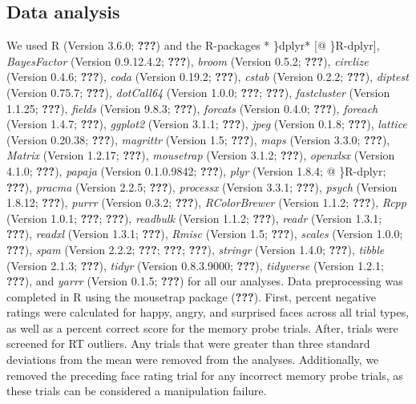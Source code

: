 \documentclass[man]{apa6}
\begin{document}
\hypertarget{data-analysis}{%
\subsection{Data analysis}\label{data-analysis}}

We used R (Version 3.6.0; {\textbf{???}}) and the R-packages * \}dplyr* {[}@ \}R-dplyr{]}, \emph{BayesFactor} (Version 0.9.12.4.2; {\textbf{???}}), \emph{broom} (Version 0.5.2; {\textbf{???}}), \emph{circlize} (Version 0.4.6; {\textbf{???}}), \emph{coda} (Version 0.19.2; {\textbf{???}}), \emph{cstab} (Version 0.2.2; {\textbf{???}}), \emph{diptest} (Version 0.75.7; {\textbf{???}}), \emph{dotCall64} (Version 1.0.0; {\textbf{???}}; {\textbf{???}}), \emph{fastcluster} (Version 1.1.25; {\textbf{???}}), \emph{fields} (Version 9.8.3; {\textbf{???}}), \emph{forcats} (Version 0.4.0; {\textbf{???}}), \emph{foreach} (Version 1.4.7; {\textbf{???}}), \emph{ggplot2} (Version 3.1.1; {\textbf{???}}), \emph{jpeg} (Version 0.1.8; {\textbf{???}}), \emph{lattice} (Version 0.20.38; {\textbf{???}}), \emph{magrittr} (Version 1.5; {\textbf{???}}), \emph{maps} (Version 3.3.0; {\textbf{???}}), \emph{Matrix} (Version 1.2.17; {\textbf{???}}), \emph{mousetrap} (Version 3.1.2; {\textbf{???}}), \emph{openxlsx} (Version 4.1.0; {\textbf{???}}), \emph{papaja} (Version 0.1.0.9842; {\textbf{???}}), \emph{plyr} (Version 1.8.4; @ \}R-dplyr; {\textbf{???}}), \emph{pracma} (Version 2.2.5; {\textbf{???}}), \emph{processx} (Version 3.3.1; {\textbf{???}}), \emph{psych} (Version 1.8.12; {\textbf{???}}), \emph{purrr} (Version 0.3.2; {\textbf{???}}), \emph{RColorBrewer} (Version 1.1.2; {\textbf{???}}), \emph{Rcpp} (Version 1.0.1; {\textbf{???}}; {\textbf{???}}), \emph{readbulk} (Version 1.1.2; {\textbf{???}}), \emph{readr} (Version 1.3.1; {\textbf{???}}), \emph{readxl} (Version 1.3.1; {\textbf{???}}), \emph{Rmisc} (Version 1.5; {\textbf{???}}), \emph{scales} (Version 1.0.0; {\textbf{???}}), \emph{spam} (Version 2.2.2; {\textbf{???}}; {\textbf{???}}; {\textbf{???}}), \emph{stringr} (Version 1.4.0; {\textbf{???}}), \emph{tibble} (Version 2.1.3; {\textbf{???}}), \emph{tidyr} (Version 0.8.3.9000; {\textbf{???}}), \emph{tidyverse} (Version 1.2.1; {\textbf{???}}), and \emph{yarrr} (Version 0.1.5; {\textbf{???}}) for all our analyses. Data preprocessing was completed in R using the mousetrap package ({\textbf{???}}). First, percent negative ratings were calculated for happy, angry, and surprised faces across all trial types, as well as a percent correct score for the memory probe trials. After, trials were screened for RT outliers. Any trials that were greater than three standard deviations from the mean were removed from the analyses. Additionally, we removed the preceding face rating trial for any incorrect memory probe trials, as these trials can be considered a manipulation failure.
\end{document}

